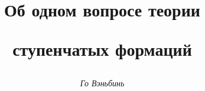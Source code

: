




%





\newcommand{\form}{\operatorname{form}}


\newcommand{\tts}[1]{}


\renewcommand{\baselinestretch}{0.99}







\setcounter{page}{33}















\author{\it Го Вэньбинь}




\title{Об одном вопросе теории


ступенчатых формаций}





\date{}




\pagestyle{plain} %







\maketitle


\label{begin}








